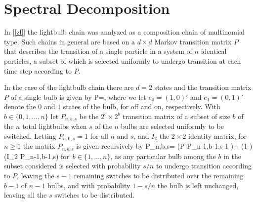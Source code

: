 \documentclass[10pt, amstex]{article}
\begin{document}
\section{Spectral Decomposition}
\label{sec:spe}


In [\ref{zl}] the lightbulb chain was analyzed as a composition chain of multinomial type. Such chains in general are based on a $d \times d$ Markov transition matrix $P$ that describes the transition of a single particle in a system of $n$ identical particles, a subset of which is selected uniformly to undergo transition at each time step according to $P$.

In the case of the lightbulb chain there are $d=2$ states and the transition matrix $P$ of a single bulb is given by
\beas
P=\left[
\begin{array}{cc}
0 & 1 \\
1 & 0
\end{array}
\right],
\enas
where we let $e_0=(1,0)'$ and $e_1=(0,1)'$ denote the $0$ and $1$ states of the bulb, for off and on, respectively.
With $b \in \{0,1,\ldots,n\}$ let $P_{n,b,s}$ be the $2^b \times 2^b$ transition matrix of a subset of size $b$
of the $n$ total lightbulbs when $s$ of the $n$ bulbs are selected uniformly to be switched. Letting $P_{n,0,s}=1$ for all $n$ and $s$, and $I_2$ the $2 \times 2$ identity matrix, for $n \ge 1$ the matrix $P_{n,b,s}$ is given recursively by
\beas
P_{n,b,s}=  \left(P \otimes P_{n-1,b-1,s-1} \right)+ (1-)\left(I_2 \otimes P_{n-1,b-1,s}\right)
\quad \mbox{for $b \in \{1,\ldots,n\}$,}
\enas
as any particular bulb among the $b$ in the subset considered is selected with probability $s/n$ to undergo transition according to $P$, leaving the $s-1$ remaining switches to be distributed over the remaining $b-1$ of $n-1$ bulbs, and with probability $1-s/n$ the bulb is left unchanged, leaving
all the $s$ switches to be distributed.
\end{document}
